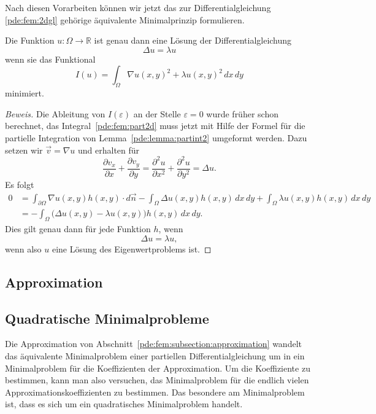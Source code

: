 Nach diesen Vorarbeiten können wir jetzt das zur Differentialgleichung
\eqref{pde:fem:2dgl} gehörige äquivalente Minimalprinzip formulieren.

\begin{satz}
Die Funktion $u\colon\Omega\to\mathbb R$ ist genau dann eine Lösung der
Differentialgleichung
\[
\Delta u =\lambda u
\]
wenn sie das Funktional
\[
I(u)
=
\int_{\Omega} \nabla u(x,y)^2 + \lambda u(x,y)^2 \,dx\,dy
\]
minimiert.
\end{satz}

\begin{proof}[Beweis]
Die Ableitung von $I(\varepsilon)$ an der Stelle $\varepsilon=0$
wurde früher schon berechnet, das Integral~\eqref{pde:fem:part2d}
muss jetzt mit Hilfe der Formel für die partielle Integration
von Lemma~\ref{pde:lemma:partint2} umgeformt werden.
Dazu setzen wir $\vec{v}=\nabla u$ und erhalten für
\[
\frac{\partial v_x}{\partial x}
+
\frac{\partial v_y}{\partial y}
=
\frac{\partial^2 u}{\partial x^2}
+
\frac{\partial^2 u}{\partial y^2}
=
\Delta u.
\]
Es folgt
\begin{align*}
0
&=
\int_{\partial\Omega} \nabla u(x,y) h(x,y) \cdot d\vec{n}
-
\int_{\Omega} \Delta u(x,y) h(x,y)\,dx\,dy
+
\int_{\Omega} \lambda u(x,y) h(x,y)\,dx\,dy
\\
&=
-
\int_{\Omega} \bigl(\Delta u(x,y)-\lambda u(x,y)\bigr) h(x,y)\,dx\,dy.
\end{align*}
Dies gilt genau dann für jede Funktion $h$, wenn
\[
\Delta u = \lambda u,
\]
wenn also $u$ eine Lösung des Eigenwertproblems ist.
\end{proof}

\subsection{Approximation
\label{pde:fem:subsection:approximation}}

\subsection{Quadratische Minimalprobleme}
Die Approximation von Abschnitt~\ref{pde:fem:subsection:approximation}
wandelt das äquivalente Minimalproblem einer partiellen Differentialgleichung
um in ein Minimalproblem für die Koeffizienten der Approximation.
Um die Koeffiziente zu bestimmen, kann man also versuchen, das
Minimalproblem für die endlich vielen Approximationskoeffizienten zu
bestimmen.
Das besondere am Minimalproblem ist, dass es sich um ein quadratisches
Minimalproblem handelt.

